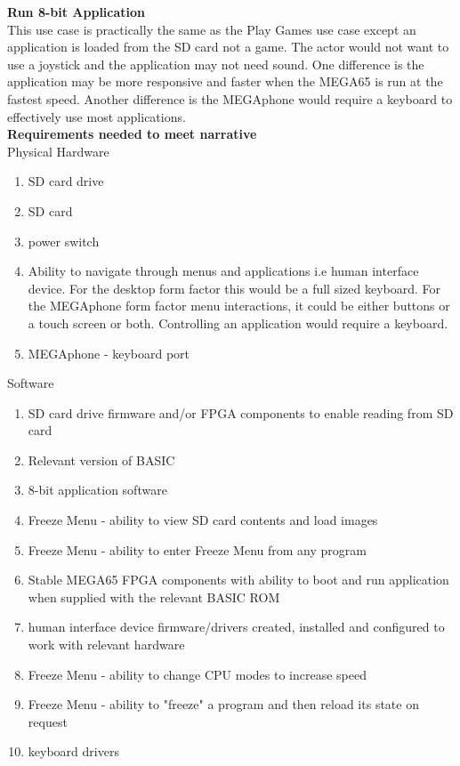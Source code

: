 \textbf{Run 8-bit Application}\\
This use case is practically the same as the Play Games use case except an application is loaded from the SD card not a game. The actor would not want to use a joystick and the application may not need sound. One difference is the application may be more responsive and faster when the MEGA65 is run at the fastest speed. Another difference is the MEGAphone would require a keyboard to effectively use most applications.\\

\textbf{Requirements needed to meet narrative}\\
Physical Hardware
\begin{enumerate}
\item SD card drive
\item SD card
\item power switch
\item Ability to navigate through menus and applications i.e human interface device. For the desktop form factor this would be a full sized keyboard. For the MEGAphone form factor menu interactions, it could be either buttons or a touch screen or both. Controlling an application would require a keyboard.
\item MEGAphone - keyboard port
\end{enumerate}

Software\\
\begin{enumerate}
\item SD card drive firmware and/or FPGA components to enable reading from SD card
\item Relevant version of BASIC 
\item 8-bit application software
\item Freeze Menu - ability to view SD card contents and load images
\item Freeze Menu - ability to enter Freeze Menu from any program
\item Stable MEGA65 FPGA components with ability to boot and run application when supplied with the relevant BASIC ROM
\item human interface device firmware/drivers created, installed and configured to work with relevant hardware
\item Freeze Menu - ability to change CPU modes to increase speed
\item Freeze Menu - ability to "freeze" a program and then reload its state on request
\item keyboard drivers
\end{enumerate}

